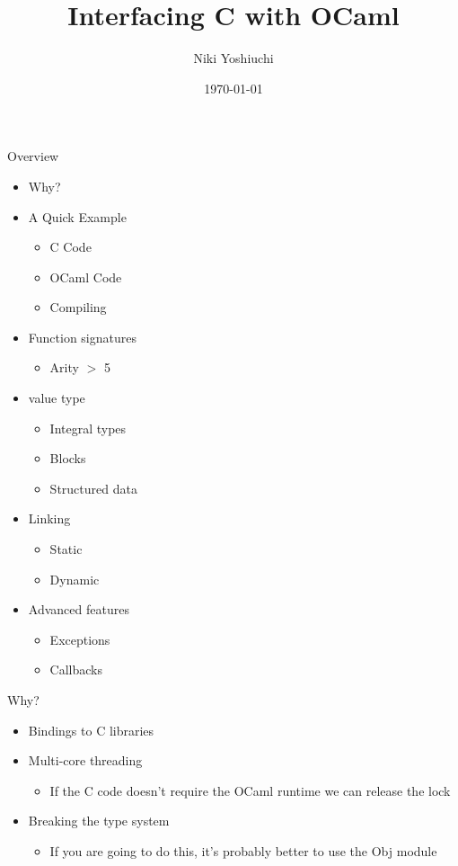 \documentclass{beamer}
\title{Interfacing C with OCaml}
\author{Niki Yoshiuchi}
\date{\today}
\begin{document}
\begin{frame}[plain]
    \titlepage
\end{frame}

\begin{frame}{Overview}
\begin{itemize}
    \item Why?
    \item A Quick Example
    \begin{itemize}
        \item C Code
        \item OCaml Code
        \item Compiling
    \end{itemize}
    \item Function signatures
    \begin{itemize}
        \item Arity $>$ 5
    \end{itemize}
    \item value type
    \begin{itemize}
        \item Integral types
        \item Blocks
        \item Structured data
    \end{itemize}
    \item Linking
    \begin{itemize}
        \item Static
        \item Dynamic
    \end{itemize}
    \item Advanced features
    \begin{itemize}
        \item Exceptions
        \item Callbacks
    \end{itemize}
\end{itemize}
\end{frame}

\begin{frame}{Why?}
\begin{itemize}
    \item Bindings to C libraries
    \item Multi-core threading
    \begin{itemize}
        \item If the C code doesn't require the OCaml runtime we can release the lock
    \end{itemize}
    \item Breaking the type system
    \begin{itemize}
        \item If you are going to do this, it's probably better to use the Obj module
    \end{itemize}
\end{itemize}
\end{frame}
\end{document}
